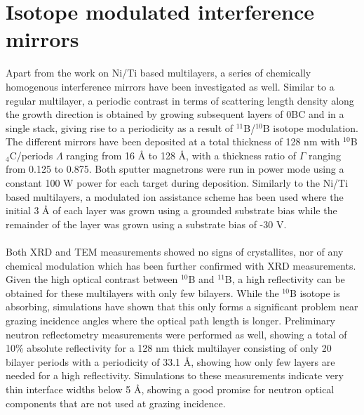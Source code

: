 \section{Isotope modulated interference mirrors}
Apart from the work on Ni/Ti based multilayers, a series of chemically homogenous \natBC interference mirrors have been investigated as well. Similar to a regular multilayer, a periodic contrast in terms of scattering length density along the growth direction is obtained by growing subsequent layers of \10BC and \BC in a single stack, giving rise to a periodicity as a result of $^\textrm{11}$B/$^\textrm{10}$B  isotope modulation. The different mirrors have been deposited at a total thickness of 128 nm with $^\textrm{10}$B$_\textrm{4}$C/\BC periods $\Lambda$ ranging from 16 Å to 128 Å, with a thickness ratio of $\Gamma$ ranging from 0.125 to 0.875. Both sputter magnetrons were run in power mode using a constant 100 W power for each target during deposition. Similarly to the Ni/Ti based multilayers, a modulated ion assistance scheme has been used where the initial 3 Å of each layer was grown using a grounded substrate bias while the remainder of the layer was grown using a substrate bias of -30 V. 
\\
\\ Both XRD and TEM measurements showed no signs of crystallites, nor of any chemical modulation which has been further confirmed with XRD measurements. Given the high optical contrast between $^\textrm{10}$B  and $^\textrm{11}$B, a high reflectivity can be obtained for these multilayers with only few bilayers.  While the $^\textrm{10}$B isotope is absorbing, simulations have shown that this only forms a significant problem near grazing incidence angles where the optical path length is longer. Preliminary neutron reflectometry measurements were performed as well, showing a total of 10\% absolute reflectivity for a 128 nm thick multilayer consisting of only 20 bilayer periods with a periodicity of 33.1 Å, showing how only few layers are needed for a high reflectivity. Simulations to these measurements indicate very thin interface widths below 5 Å, showing a good promise for neutron optical components that are not used at grazing incidence.